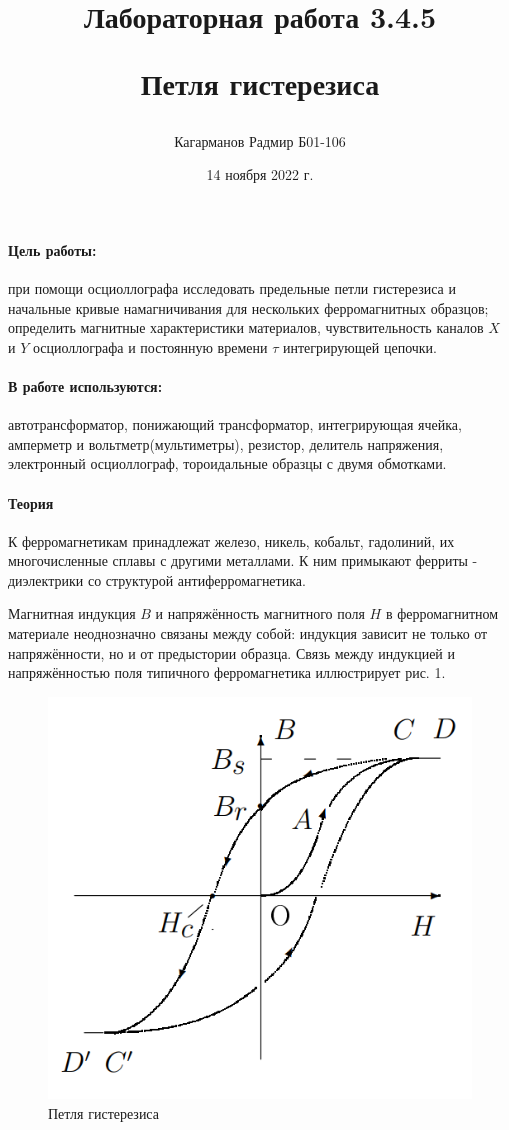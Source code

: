 \documentclass[a4paper,12pt]{article}
\title{Лабораторная работа 3.4.5

Петля гистерезиса}
\author{Кагарманов Радмир Б01-106}
\date{14 ноября 2022 г.}
\begin{document}
\maketitle
\thispagestyle{empty}
\newpage
\setcounter{page}{1}

\paragraph{Цель работы:} при помощи осциоллографа исследовать предельные петли гистерезиса и начальные кривые намагничивания для нескольких ферромагнитных образцов; определить магнитные характеристики материалов, чувствительность каналов $X$ и $Y$ осциоллографа и постоянную времени $\tau$ интегрирующей цепочки.

\paragraph{В работе используются:} автотрансформатор, понижающий трансформатор, интегрирующая ячейка, амперметр и вольтметр(мультиметры), резистор, делитель напряжения, электронный осциоллограф, тороидальные образцы с двумя обмотками.

\paragraph{Теория\\} 
К ферромагнетикам принадлежат железо, никель, кобальт, гадолиний, их многочисленные сплавы с другими металлами. К ним примыкают ферриты - диэлектрики со структурой антиферромагнетика.\par
Магнитная индукция $B$ и напряжённость магнитного поля $H$ в ферромагнитном материале неоднозначно связаны между собой: индукция зависит не только от напряжённости, но и от предыстории образца. Связь между индукцией и напряжённостью поля типичного ферромагнетика иллюстрирует рис. 1.
\begin{figure}[!h]
\centering
\includegraphics[width=0.5\linewidth]{петля гистерезиса.png}
\caption{Петля гистерезиса}
\label{fig:mpr}
\end{figure}
\end{document}
